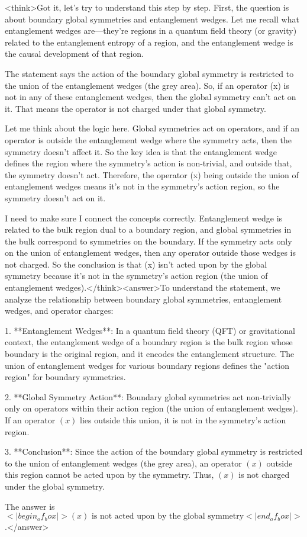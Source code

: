 <think>Got it, let's try to understand this step by step. First, the question is about boundary global symmetries and entanglement wedges. Let me recall what entanglement wedges are—they're regions in a quantum field theory (or gravity) related to the entanglement entropy of a region, and the entanglement wedge is the causal development of that region. 

The statement says the action of the boundary global symmetry is restricted to the union of the entanglement wedges (the grey area). So, if an operator (x) is not in any of these entanglement wedges, then the global symmetry can't act on it. That means the operator is not charged under that global symmetry. 

Let me think about the logic here. Global symmetries act on operators, and if an operator is outside the entanglement wedge where the symmetry acts, then the symmetry doesn't affect it. So the key idea is that the entanglement wedge defines the region where the symmetry's action is non-trivial, and outside that, the symmetry doesn't act. Therefore, the operator (x) being outside the union of entanglement wedges means it's not in the symmetry's action region, so the symmetry doesn't act on it. 

I need to make sure I connect the concepts correctly. Entanglement wedge is related to the bulk region dual to a boundary region, and global symmetries in the bulk correspond to symmetries on the boundary. If the symmetry acts only on the union of entanglement wedges, then any operator outside those wedges is not charged. So the conclusion is that (x) isn't acted upon by the global symmetry because it's not in the symmetry's action region (the union of entanglement wedges).</think><answer>To understand the statement, we analyze the relationship between boundary global symmetries, entanglement wedges, and operator charges:  

1. **Entanglement Wedges**: In a quantum field theory (QFT) or gravitational context, the entanglement wedge of a boundary region is the bulk region whose boundary is the original region, and it encodes the entanglement structure. The union of entanglement wedges for various boundary regions defines the "action region" for boundary symmetries.  

2. **Global Symmetry Action**: Boundary global symmetries act non-trivially only on operators within their action region (the union of entanglement wedges). If an operator \((x)\) lies outside this union, it is not in the symmetry’s action region.  

3. **Conclusion**: Since the action of the boundary global symmetry is restricted to the union of entanglement wedges (the grey area), an operator \((x)\) outside this region cannot be acted upon by the symmetry. Thus, \((x)\) is not charged under the global symmetry.  

The answer is \(<|begin_of_box|>(x) \text{ is not acted upon by the global symmetry}<|end_of_box|>\).</answer>